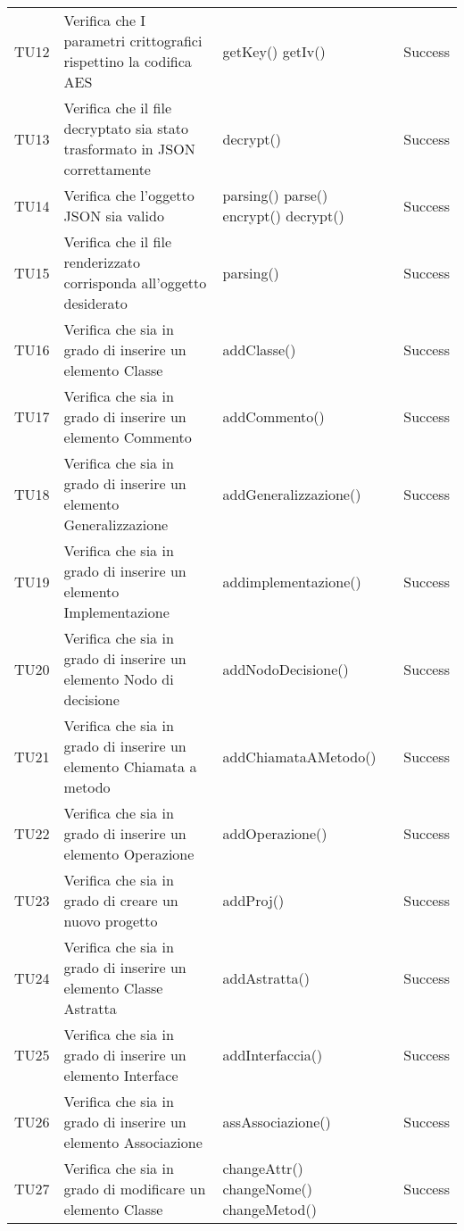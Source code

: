 \begin{longtable}{p{2cm}!{\VRule[1pt]}p{5cm}!{\VRule[1pt]}p{4.5cm}!{\VRule[1pt]}p{1.5cm}}
TU12 & Verifica che I parametri crittografici rispettino la codifica AES & getKey() \newline getIv() & Success  \\ 
TU13 & Verifica che il file decryptato sia stato trasformato in JSON correttamente & decrypt() & Success  \\ 
TU14 & Verifica che l'oggetto JSON sia valido & parsing() \newline parse() \newline encrypt() \newline decrypt() & Success  \\ 
TU15 & Verifica che il file renderizzato corrisponda all'oggetto desiderato & parsing() & Success  \\ 
TU16 & Verifica che sia in grado di inserire un elemento Classe & addClasse() & Success  \\ 
TU17 & Verifica che sia in grado di inserire un elemento Commento & addCommento() & Success  \\ 
TU18 & Verifica che sia in grado di inserire un elemento Generalizzazione & addGeneralizzazione() & Success  \\ 
TU19 & Verifica che sia in grado di inserire un elemento Implementazione & addimplementazione() & Success  \\ 
TU20 & Verifica che sia in grado di inserire un elemento Nodo di decisione & addNodoDecisione() & Success  \\ 
TU21 & Verifica che sia in grado di inserire un elemento Chiamata a metodo & addChiamataAMetodo() & Success  \\ 
TU22 & Verifica che sia in grado di inserire un elemento Operazione & addOperazione() & Success  \\ 
TU23 & Verifica che sia in grado di creare un nuovo progetto & addProj() & Success  \\ 
TU24 & Verifica che sia in grado di inserire un elemento Classe Astratta & addAstratta() & Success  \\ 
TU25 & Verifica che sia in grado di inserire un elemento Interface & addInterfaccia() & Success  \\ 
TU26 & Verifica che sia in grado di inserire un elemento Associazione & assAssociazione() & Success  \\ 
TU27 & Verifica che sia in grado di modificare un elemento Classe & changeAttr() \newline changeNome() \newline changeMetod() & Success  \\ 

\end{longtable}
